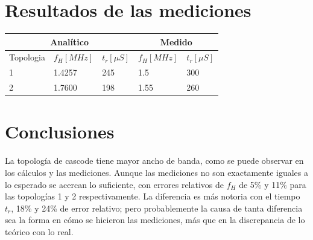 \documentclass[letterpaper, 10 pt, conference]{ieeeconf}  %
\begin{document}
\section{Resultados de las mediciones}

 \begin{table}[H]
   \centering
   \begin{tabular}{|lll|ll|}
     \hline
     \multicolumn{3}{|c|}{Analítico}                                                    & \multicolumn{2}{c|}{Medido}                      \\ \hline
     \multicolumn{1}{|l|}{Topologia}  & \multicolumn{1}{l|}{$f_H \left[MHz\right]$}  & $t_r \left[\mu S\right]$ & \multicolumn{1}{l|}{$f_H \left[MHz\right]$} & $t_r \left[\mu  S\right]$ \\ \hline
     \multicolumn{1}{|l|}{1}          & \multicolumn{1}{l|}{1.4257}       & 245         & \multicolumn{1}{l|}{1.5}           & 300         \\ \hline
     \multicolumn{1}{|l|}{2}          & \multicolumn{1}{l|}{1.7600}       & 198         & \multicolumn{1}{l|}{1.55}          & 260         \\ \hline
   \end{tabular}
 \end{table}

\section{Conclusiones}
La topología de cascode tiene mayor ancho de banda, como se puede observar en los cálculos y las mediciones. Aunque las mediciones no son exactamente iguales a lo esperado se acercan lo suficiente, con errores relativos de $f_H$ de 5\% y 11\% para las topologías 1 y 2 respectivamente. La diferencia es más notoria con el tiempo $t_r$, 18\% y 24\% de error relativo; pero probablemente la causa de tanta diferencia sea la forma en cómo se hicieron las mediciones, más que en la discrepancia de lo teórico con lo real.
\end{document}
